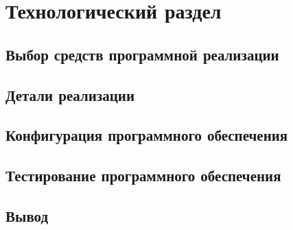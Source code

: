 \chapter{Технологический раздел}

\section{Выбор средств программной реализации}

\section{Детали реализации}

\section{Конфигурация программного обеспечения}

\section{Тестирование программного обеспечения}

\section*{Вывод}



